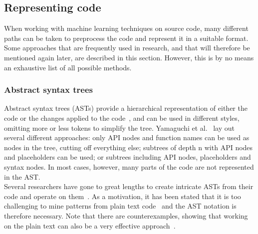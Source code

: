 \documentclass[
a4paper,
pagesize,
pdftex,
12pt,
ngerman,
fleqn,
final,
]{scrartcl}
\begin{document}
	\subsection{Representing code}
	
	When working with machine learning techniques on source code, many different paths can be taken to preprocess the code and represent it in a suitable format. Some approaches that are frequently used in research, and that will therefore be mentioned again later, are described in this section. However, this is by no means an exhaustive list of all possible methods. 
	
	\subsubsection{Abstract syntax trees}
	Abstract syntax trees (ASTs) provide a hierarchical representation of either the code or the changes applied to the code~\cite{Liu.2018}, and can be used in different styles, omitting more or less tokens to simplify the tree. Yamaguchi et al.~\cite{Yamaguchi.2012} lay out several different approaches: only API nodes and function names can be used as nodes in the tree, cutting off everything else; subtrees of depth n with API nodes and placeholders can be used; or subtrees including API nodes, placeholders and syntax nodes. In most cases, however, many parts of the code are not represented in the AST.\\ Several researchers have gone to great lengths to create intricate ASTs from their code and operate on them~\cite{Ma.2017,Yamaguchi.2012}. As a motivation, it has been stated that it is too challenging to mine patterns from plain text code~\cite{Liu.2018} and the AST notation is therefore necessary. Note that there are counterexamples, showing that working on the plain text can also be a very effective approach~\cite{Russell.2018,Hovsepyan.2012}.\\
	
\end{document}

